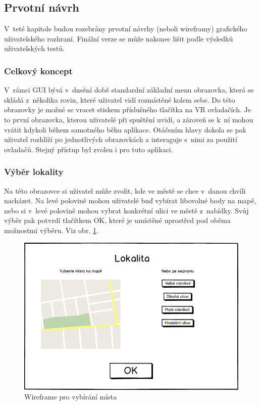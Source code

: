 \documentclass[thesis=B,czech]{FITthesis}[2012/06/26]
\begin{document}
	\subsection{Prvotní návrh}
V~teté kapitole budou rozebrány prvotní návrhy (neboli wireframy) grafického uživatelského rozhraní. Finální verze se může nakonec lišit podle výsledků uživatelských testů.

	\subsubsection{Celkový koncept}
V~rámci GUI bývá v~dnešní době standardní základní menu obrazovka, která se skládá z~několika rovin, které uživatel vidí rozmístěné kolem sebe. Do této obrazovky je možné se vracet stiskem příslušného tlačítka na VR ovladačích. Je to první obrazovka, kterou uživatelé při spuštění uvidí, a zároveň se k~ní mohou vrátit kdykoli během samotného běhu aplikace. Otáčením hlavy dokola se pak uživatel rozhlíží po jednotlivých obrazovkách a interaguje s~nimi za použití ovladačů. Stejný přístup byl zvolen i pro tuto aplikaci. 

	\subsubsection{Výběr lokality}
Na této obrazovce si uživatel může zvolit, kde ve městě se chce v~danou chvíli nacházet. Na levé polovině mohou uživatelé buď vybírat libovolné body na mapě, nebo si v~levé polovině mohou vybrat konkrétní ulici ve městě z~nabídky.  Svůj výběr pak potvrdí tlačítkem OK, které je umístěné uprostřed pod oběma možnostmi výběru. Viz obr. \ref{fig:mockMisto}.

	\begin{figure}
  		\includegraphics[width=\textwidth,height=\textheight,keepaspectratio]{MockMisto.png}
  		\caption{Wireframe pro vybírání místa}
  		\label{fig:mockMisto}
	\end{figure}
	
\end{document}
